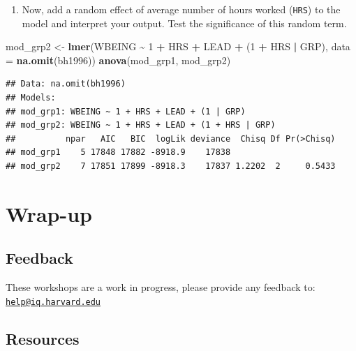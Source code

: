 \documentclass[
]{book}
\newenvironment{Shaded}{\begin{snugshade}}{\end{snugshade}}
\newcommand{\DataTypeTok}[1]{\textcolor[rgb]{0.13,0.29,0.53}{#1}}
\newcommand{\DecValTok}[1]{\textcolor[rgb]{0.00,0.00,0.81}{#1}}
\newcommand{\KeywordTok}[1]{\textcolor[rgb]{0.13,0.29,0.53}{\textbf{#1}}}
\newcommand{\NormalTok}[1]{#1}
\newcommand{\OperatorTok}[1]{\textcolor[rgb]{0.81,0.36,0.00}{\textbf{#1}}}
\newcommand{\StringTok}[1]{\textcolor[rgb]{0.31,0.60,0.02}{#1}}
\providecommand{\tightlist}{%
  \setlength{\itemsep}{0pt}\setlength{\parskip}{0pt}}
\begin{document}
\begin{enumerate}
\def\labelenumi{\arabic{enumi}.}
\setcounter{enumi}{3}
\tightlist
\item
  Now, add a random effect of average number of hours worked (\texttt{HRS}) to the model and interpret your output. Test the significance of this random term.
\end{enumerate}

\begin{Shaded}
\begin{Highlighting}[]
\NormalTok{  mod\_grp2 \textless{}{-}}\StringTok{ }\KeywordTok{lmer}\NormalTok{(WBEING }\OperatorTok{\textasciitilde{}}\StringTok{ }\DecValTok{1} \OperatorTok{+}\StringTok{ }\NormalTok{HRS }\OperatorTok{+}\StringTok{ }\NormalTok{LEAD }\OperatorTok{+}\StringTok{ }\NormalTok{(}\DecValTok{1} \OperatorTok{+}\StringTok{ }\NormalTok{HRS }\OperatorTok{|}\StringTok{ }\NormalTok{GRP), }\DataTypeTok{data =} \KeywordTok{na.omit}\NormalTok{(bh1996))}
  \KeywordTok{anova}\NormalTok{(mod\_grp1, mod\_grp2)}
\end{Highlighting}
\end{Shaded}

\begin{verbatim}
## Data: na.omit(bh1996)
## Models:
## mod_grp1: WBEING ~ 1 + HRS + LEAD + (1 | GRP)
## mod_grp2: WBEING ~ 1 + HRS + LEAD + (1 + HRS | GRP)
##          npar   AIC   BIC  logLik deviance  Chisq Df Pr(>Chisq)
## mod_grp1    5 17848 17882 -8918.9    17838                     
## mod_grp2    7 17851 17899 -8918.3    17837 1.2202  2     0.5433
\end{verbatim}

\hypertarget{wrap-up-2}{%
\section{Wrap-up}\label{wrap-up-2}}

\hypertarget{feedback-2}{%
\subsection{Feedback}\label{feedback-2}}

These workshops are a work in progress, please provide any feedback to: \href{mailto:help@iq.harvard.edu}{\nolinkurl{help@iq.harvard.edu}}

\hypertarget{resources-3}{%
\subsection{Resources}\label{resources-3}}
\end{document}
